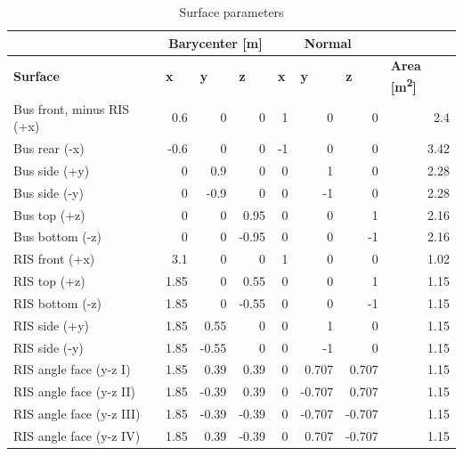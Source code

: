\begin{longtable}{l|r|r|r|r|r|r|r}
\caption{Surface parameters}
\label{tab:surfaces}\\
 &
  \multicolumn{3}{c}{\textbf{Barycenter [m]}} &
  \multicolumn{3}{c}{\textbf{Normal}} &
  \multicolumn{1}{l}{} \\
\endfirsthead
%
\endhead
%
\textbf{Surface} &
  \multicolumn{1}{l}{\textbf{x}} &
  \multicolumn{1}{l}{\textbf{y}} &
  \multicolumn{1}{l}{\textbf{z}} &
  \multicolumn{1}{l}{\textbf{x}} &
  \multicolumn{1}{l}{\textbf{y}} &
  \multicolumn{1}{l}{\textbf{z}} &
  \multicolumn{1}{l}{\textbf{Area [m\textsuperscript{2}]}} \\ \hline
Bus front, minus RIS (+x) & 0.6   & 0     & 0     & 1      & 0      & 0      & 2.4   \\
Bus rear (-x)                  & -0.6  & 0     & 0     & -1     & 0      & 0      & 3.42  \\
Bus side (+y)                  & 0     & 0.9   & 0     & 0      & 1      & 0      & 2.28  \\
Bus side (-y)                  & 0     & -0.9  & 0     & 0      & -1     & 0      & 2.28  \\
Bus top (+z)                   & 0     & 0     & 0.95  & 0      & 0      & 1      & 2.16  \\
Bus bottom (-z)                & 0     & 0     & -0.95 & 0      & 0      & -1     & 2.16  \\
RIS front (+x)                 & 3.1   & 0     & 0     & 1      & 0      & 0      & 1.02  \\
RIS top (+z)                   & 1.85  & 0     & 0.55  & 0      & 0      & 1      & 1.15  \\
RIS bottom (-z)                & 1.85  & 0     & -0.55 & 0      & 0      & -1     & 1.15  \\
RIS side (+y)                  & 1.85  & 0.55  & 0     & 0      & 1      & 0      & 1.15  \\
RIS side (-y)                  & 1.85  & -0.55 & 0     & 0      & -1     & 0      & 1.15  \\
RIS angle face (y-z I)         & 1.85  & 0.39  & 0.39  & 0      & 0.707  & 0.707  & 1.15  \\
RIS angle face (y-z II)        & 1.85  & -0.39 & 0.39  & 0      & -0.707 & 0.707  & 1.15  \\
RIS angle face (y-z III)       & 1.85  & -0.39 & -0.39 & 0      & -0.707 & -0.707 & 1.15  \\
RIS angle face (y-z IV)        & 1.85  & 0.39  & -0.39 & 0      & 0.707  & -0.707 & 1.15  \\

\end{longtable}
